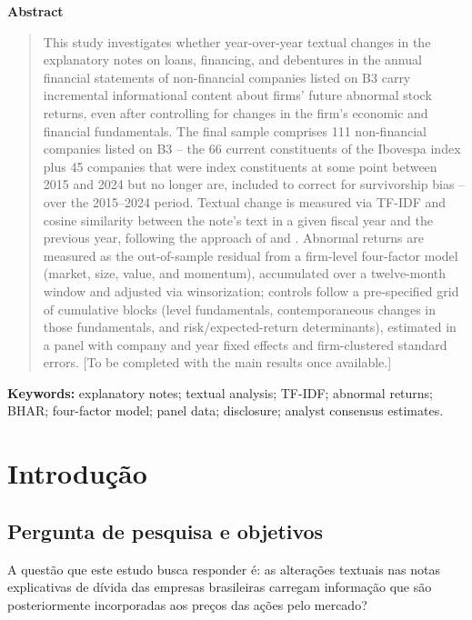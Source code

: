 \documentclass[a4paper,12pt]{report}
\renewenvironment{abstract}{
    \begin{center}
        \textbf{\abstractname}
    \end{center}
    \begin{quote}
}{\end{quote}}
\begin{document}
\renewcommand{\abstractname}{Abstract}
\begin{abstract}
    This study investigates whether year-over-year textual changes in the explanatory notes on loans, financing, and debentures in the annual financial statements of non-financial companies listed on B3 carry incremental informational content about firms' future abnormal stock returns, even after controlling for changes in the firm's economic and financial fundamentals. The final sample comprises 111 non-financial companies listed on B3 -- the 66 current constituents of the Ibovespa index plus 45 companies that were index constituents at some point between 2015 and 2024 but no longer are, included to correct for survivorship bias -- over the 2015--2024 period. Textual change is measured via TF-IDF and cosine similarity between the note's text in a given fiscal year and the previous year, following the approach of  and . Abnormal returns are measured as the out-of-sample residual from a firm-level four-factor model (market, size, value, and momentum), accumulated over a twelve-month window and adjusted via winsorization; controls follow a pre-specified grid of cumulative blocks (level fundamentals, contemporaneous changes in those fundamentals, and risk/expected-return determinants), estimated in a panel with company and year fixed effects and firm-clustered standard errors. [To be completed with the main results once available.]
\end{abstract}

\noindent
\textbf{Keywords:} explanatory notes; textual analysis; TF-IDF; abnormal returns; BHAR; four-factor model; panel data; disclosure; analyst consensus estimates.
\thispagestyle{empty}
\newpage

\tableofcontents
\thispagestyle{empty}
\newpage

\chapter{Introdução}

\section{Pergunta de pesquisa e objetivos}

A questão que este estudo busca responder é: as alterações textuais nas notas explicativas de dívida das empresas brasileiras carregam informação que são posteriormente incorporadas aos preços das ações pelo mercado?
\end{document}
